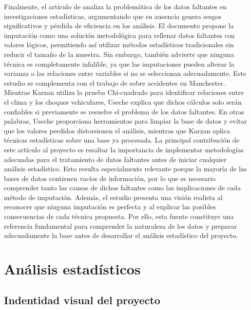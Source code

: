 \documentclass[12pt]{article}
\begin{document}
Finalmente, el artículo de \textcite{USECHE2006} analiza la problemática de los datos faltantes en investigaciones estadísticas, argumentando que su ausencia genera sesgos significativos y pérdida de eficiencia en los análisis. El documento propone la imputación como una solución metodológica para rellenar datos faltantes con valores lógicos, permitiendo así utilizar métodos estadísticos tradicionales sin reducir el tamaño de la muestra. Sin embargo, también advierte que ninguna técnica es completamente infalible, ya que las imputaciones pueden alterar la varianza o las relaciones entre variables si no se seleccionan adecuadamente. Este estudio se complementa con el trabajo de \textcite{KARZAN2017} sobre accidentes en Manchester. Mientras Karzan utiliza la prueba Chi-cuadrado para identificar relaciones entre el clima y los choques vehiculares, Useche explica que dichos cálculos solo serán confiables si previamente se resuelve el problema de los datos faltantes. En otras palabras, Useche proporciona herramientas para limpiar la base de datos y evitar que los valores perdidos distorsionen el análisis, mientras que Karzan aplica técnicas estadísticas sobre una base ya procesada. La principal contribución de este artículo al proyecto es resaltar la importancia de implementar metodologías adecuadas para el tratamiento de datos faltantes antes de iniciar cualquier análisis estadístico. Esto resulta especialmente relevante porque la mayoría de las bases de datos contienen vacíos de información, por lo que es necesario comprender tanto las causas de dichos faltantes como las implicaciones de cada método de imputación. Además, el estudio presenta una visión realista al reconocer que ninguna imputación es perfecta y al explicar las posibles consecuencias de cada técnica propuesta. Por ello, esta fuente constituye una referencia fundamental para comprender la naturaleza de los datos y preparar adecuadamente la base antes de desarrollar el análisis estadístico del proyecto.


\section{Análisis estadísticos}
\subsection{Indentidad visual del proyecto}
\end{document}
